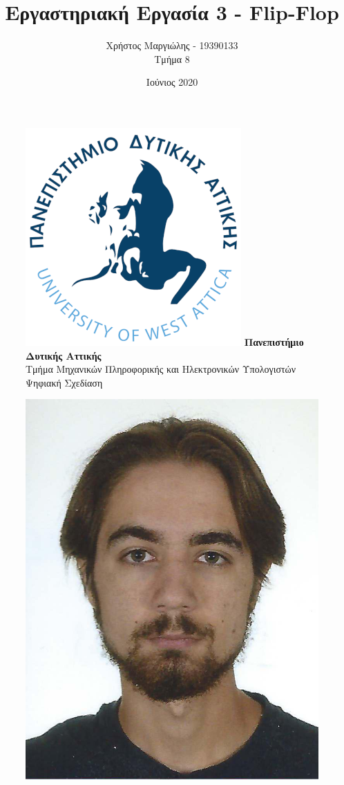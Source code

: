 \documentclass{article}
\title{Εργαστηριακή Εργασία 3 - Flip-Flop}
\author{Χρήστος Μαργιώλης - 19390133 \\ Τμήμα 8}
\date{Ιούνιος 2020}
\begin{document}
\begin{figure}[t!]
    \centering
    \includegraphics[scale=0.3, center]{./res/Logo_University_of_West_Attica.png}
    \Large
    \textbf{Πανεπιστήμιο Δυτικής Αττικής} \\
    \large
    Τμήμα Μηχανικών Πληροφορικής και Ηλεκτρονικών Υπολογιστών \\
    Ψηφιακή Σχεδίαση
\end{figure}
\begin{figure}[b]
    \centering
    \includegraphics[scale=1]{./res/19390133.jpeg}
\end{figure}
\end{document}
